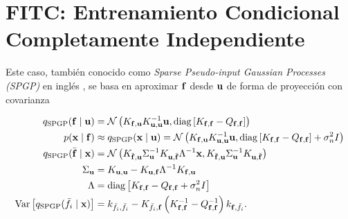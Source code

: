 \section{FITC: Entrenamiento Condicional Completamente Independiente}

Este caso, también conocido como \emph{Sparse Pseudo-input Gaussian Processes (SPGP)} en inglés \cite{snelson2005sparse}, se basa en aproximar \(\mathbf{f}\) desde \(\mathbf{u}\) de forma de proyección con covarianza

\begin{align*}
	q_{\mathrm{SPGP}} (\mathbf{f} \mid \mathbf{u})			&= \mathcal{N}\left(K_{\mathbf{f}, \mathbf{u}} K_{\mathbf{u}, \mathbf{u}}^{-1} \mathbf{u}, \operatorname{diag}\left[K_{\mathbf{f}, \mathbf{f}} - Q_{\mathbf{f}, \mathbf{f}}\right] \right) \\
	p(\mathbf{x} \mid \mathbf{f})							&\approx q_{\mathrm{SPGP}} (\mathbf{x} \mid \mathbf{u}) = \mathcal{N}\left(K_{\mathbf{f}, \mathbf{u}} K_{\mathbf{u}, \mathbf{u}}^{-1} \mathbf{u}, \operatorname{diag} \left[K_{\mathbf{f}, \mathbf{f}} - Q_{\mathbf{f}, \mathbf{f}}\right] + \sigma_n^2 I\right) \\
	q_{\mathrm{SPGP}} (\bar{\mathbf{f}} \mid \mathbf{x})	&= \mathcal{N}\left( K_{\bar{\mathbf{f}}, \mathbf{u}} \Sigma_{\mathbf{u}}^{-1} K_{\mathbf{u}, \bar{\mathbf{f}}} \Lambda^{-1} \mathbf{x}, K_{\bar{\mathbf{f}}, \mathbf{u}} \Sigma_{\mathbf{u}}^{-1} K_{\mathbf{u}, \bar{\mathbf{f}}}\right) \\
	\Sigma_{\mathbf{u}}								&= K_{\mathbf{u}, \mathbf{u}} - K_{\mathbf{u}, \mathbf{f}} \Lambda^{-1} K_{\mathbf{f}, \mathbf{u}} \\
	\Lambda										&= \operatorname{diag} \left[K_{\mathbf{f}, \mathbf{f}} - Q_{\mathbf{f}, \mathbf{f}} + \sigma_n^2 I\right] \\
	\operatorname{Var}\left[q_{\mathrm{SPGP}}(\bar{f}_{i} \mid \mathbf{x})\right]	&= k_{\bar{f}_{i}, \bar{f}_{i}} - K_{\bar{f}_{i}, \mathbf{f}} \left(K_{\mathbf{f}, \mathbf{f}}^{-1} - Q_{\mathbf{f}, \mathbf{f}}^{-1}\right) k_{\mathbf{f}, \bar{f}_{i}}.
\end{align*}

